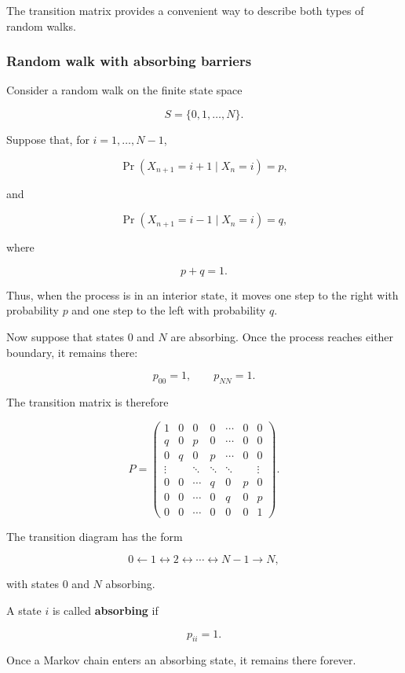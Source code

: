 \documentclass[
  letterpaper,
  DIV=11,
  numbers=noendperiod]{scrartcl}
\theoremstyle{definition}
\theoremstyle{remark}
\begin{document}
The transition matrix provides a convenient way to describe both types
of random walks.

\subsubsection{Random walk with absorbing
barriers}\label{random-walk-with-absorbing-barriers}

Consider a random walk on the finite state space

\[
S=\{0,1,\ldots,N\}.
\]

Suppose that, for \(i=1,\ldots,N-1\),

\[
\Pr(X_{n+1}=i+1\mid X_n=i)=p,
\]

and

\[
\Pr(X_{n+1}=i-1\mid X_n=i)=q,
\]

where

\[
p+q=1.
\]

Thus, when the process is in an interior state, it moves one step to the
right with probability \(p\) and one step to the left with probability
\(q\).

Now suppose that states \(0\) and \(N\) are absorbing. Once the process
reaches either boundary, it remains there:

\[
p_{00}=1,
\qquad
p_{NN}=1.
\]

The transition matrix is therefore

\[
P=
\begin{pmatrix}
1 & 0 & 0 & 0 & \cdots & 0 & 0\\
q & 0 & p & 0 & \cdots & 0 & 0\\
0 & q & 0 & p & \cdots & 0 & 0\\
\vdots & & \ddots & \ddots & \ddots & & \vdots\\
0 & 0 & \cdots & q & 0 & p & 0\\
0 & 0 & \cdots & 0 & q & 0 & p\\
0 & 0 & \cdots & 0 & 0 & 0 & 1
\end{pmatrix}.
\]

The transition diagram has the form

\[
0
\longleftarrow
1
\longleftrightarrow
2
\longleftrightarrow
\cdots
\longleftrightarrow
N-1
\longrightarrow
N,
\]

with states \(0\) and \(N\) absorbing.

\begin{tcolorbox}[enhanced jigsaw, arc=.35mm, bottomrule=.15mm, bottomtitle=1mm, breakable, colback=white, colbacktitle=quarto-callout-note-color!10!white, colframe=quarto-callout-note-color-frame, coltitle=black, left=2mm, leftrule=.75mm, opacityback=0, opacitybacktitle=0.6, rightrule=.15mm, title=\textcolor{quarto-callout-note-color}{\faInfo}\hspace{0.5em}{Absorbing state}, titlerule=0mm, toprule=.15mm, toptitle=1mm]

A state \(i\) is called \textbf{absorbing} if

\[
p_{ii}=1.
\]

Once a Markov chain enters an absorbing state, it remains there forever.

\end{tcolorbox}
\end{document}
